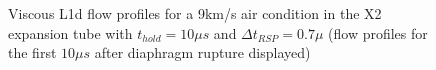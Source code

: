 \documentclass[a4paper,10pt]{article}
\begin{document}
\begin{figure}[htb]
\begin{center}
{{      } \quad
      }
    \caption{Viscous L1d flow profiles for a 9km/s air condition in the X2 expansion tube with $t_{hold} = 10 \mu s$ and $\Delta t_{RSP} = 0.7 \mu $ (flow profiles for the first $10 \mu s$ after diaphragm rupture displayed)}
    \label{fig:air_profiles_viscous}
  \end{center}
\end{figure}
\end{document}
